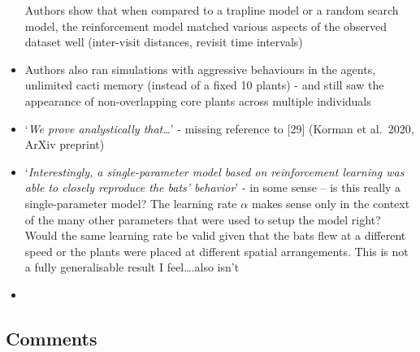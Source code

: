 \documentclass[
]{book}
\begin{document}
\begin{itemize}
  Authors show that when compared to a trapline model or a random search model, the reinforcement model matched various aspects of the observed dataset well (inter-visit distances, revisit time intervals)
\item
  Authors also ran simulations with aggressive behaviours in the agents, unlimited cacti memory (instead of a fixed 10 plants) - and still saw the appearance of non-overlapping core plants across multiple individuals
\item
  `\emph{We prove analystically that\ldots{}}' - missing reference to {[}29{]} (Korman et al.~2020, ArXiv preprint)
\item
  `\emph{Interestingly, a single-parameter model based on reinforcement learning was able to closely reproduce the bats' behavior}' - in some sense -- is this really a single-parameter model? The learning rate \(\alpha\) makes sense only in the context of the many other parameters that were used to setup the model right? Would the same learning rate be valid given that the bats flew at a different speed or the plants were placed at different spatial arrangements. This is not a fully generalisable result I feel\ldots.also isn't
\item
\end{itemize}

\hypertarget{comments-8}{%
\subsection{Comments}\label{comments-8}}
\end{document}
